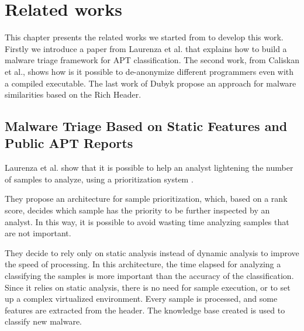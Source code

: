 \chapter{Related works}

This chapter presents the related works we started from to develop this work. Firstly we introduce a paper from Laurenza et al. that explains how to build a malware triage framework for APT classification. The second work, from Caliskan et al., shows how is it possible to de-anonymize different programmers even with a compiled executable. The last work of Dubyk propose an approach for malware similarities based on the Rich Header.

\section{Malware Triage Based on Static Features and Public APT Reports}
Laurenza et al. show that it is possible to help an analyst lightening the number of samples to analyze, using a prioritization system \cite{laurenza2017malware}. 

They propose an architecture for sample prioritization, which, based on a rank score, decides which sample has the priority to be further inspected by an analyst. In this way, it is possible to avoid wasting time analyzing samples that are not important. 

They decide to rely only on static analysis instead of dynamic analysis to improve the speed of processing. In this architecture, the time elapsed for analyzing a classifying the samples is more important than the accuracy of the classification. Since it relies on static analysis, there is no need for sample execution, or to set up a complex virtualized environment. Every sample is processed, and some features are extracted from the header. The knowledge base created is used to classify new malware.

